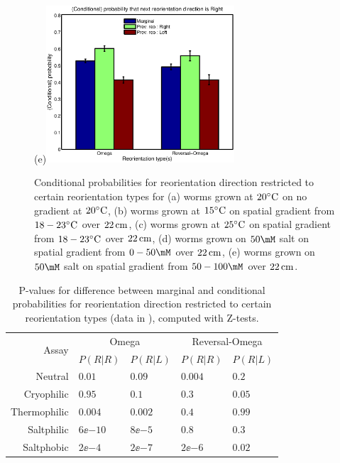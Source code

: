 \documentclass[12pt]{article}
\begin{document}
\begin{figure}
\begin{center}
  (e)\includegraphics[width=7cm]{cond_dir_vs_type_(saltphobic).eps}
\end{center}
  \caption[Conditional probabilities for reorientation direction restricted to certain reorientation types.]{Conditional probabilities for reorientation direction restricted to certain reorientation types for
  (a) worms grown at $20^\circ\mathrm{C}$ on no gradient at $20^\circ\mathrm{C}$,
  (b) worms grown at $15^\circ\mathrm{C}$ on spatial gradient from $18-23^\circ\mathrm{C}$ over $22\,\mathrm{cm}$,
  (c) worms grown at $25^\circ\mathrm{C}$ on spatial gradient from $18-23^\circ\mathrm{C}$ over $22\,\mathrm{cm}$,
  (d) worms grown on $50\mM$ salt on spatial gradient from $0-50\mM$ over $22\,\mathrm{cm}$,
  (e) worms grown on $50\mM$ salt on spatial gradient from $50-100\mM$ over $22\,\mathrm{cm}$.}\label{fig:dirvstype}
\end{figure}

\begin{table}
  \begin{center}
  \begin{tabular}{|r|l|l|l|l|}
    \hline
    \multirow{2}{*}{Assay} & \multicolumn{2}{|c|}{Omega} & \multicolumn{2}{|c|}{Reversal-Omega} \\
      \cline{2-5}
      & $P(R|R)$ & $P(R|L)$ & $P(R|R)$ & $P(R|L)$ \\
    \hline
    Neutral      & $0.01$ & $0.09$ & $0.004$ & $0.2$ \\
    Cryophilic   & $0.95$ & $0.1$ & $0.3$ & $0.05$ \\
    Thermophilic & $0.004$ & $0.002$ & $0.4$ & $0.99$ \\
    Saltphilic   & $6\ee{-10}$ & $8\ee{-5}$ & $0.8$ & $0.3$ \\
    Saltphobic   & $2\ee{-4}$ & $2\ee{-7}$ & $2\ee{-6}$ & $0.02$ \\
    \hline
  \end{tabular}
  \end{center}
  \caption[P-values for differences in conditional probabilities for reorientation direction restricted to certain reorientation types]{P-values for difference between marginal and conditional probabilities for reorientation direction restricted to certain reorientation types (data in ), computed with Z-tests.}\label{tab:dirvstype}
\end{table}
\end{document}
